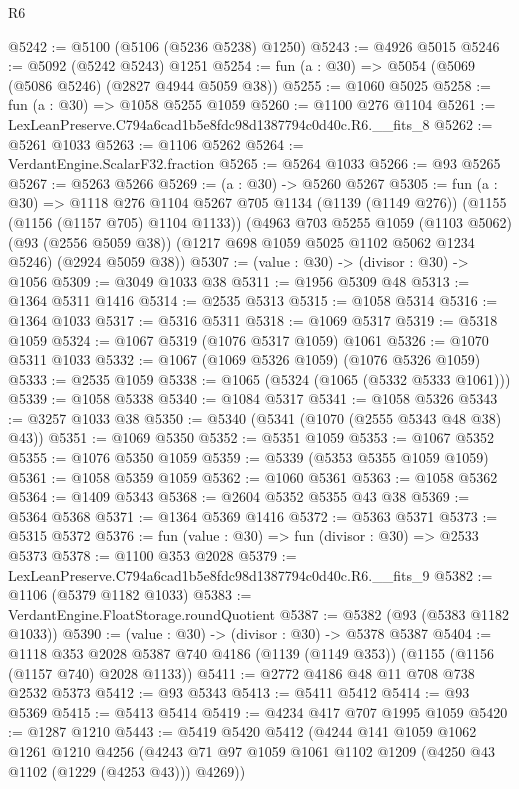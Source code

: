 \begin{lexlean}{R6}
\begin{coremodule}
@5242 := @5100 (@5106 (@5236 @5238) @1250)
@5243 := @4926 @5015
@5246 := @5092 (@5242 @5243) @1251
@5254 := fun (a : @30) => @5054 (@5069 (@5086 @5246) (@2827 @4944 @5059 @38))
@5255 := @1060 @5025
@5258 := fun (a : @30) => @1058 @5255 @1059
@5260 := @1100 @276 @1104
@5261 := LexLeanPreserve.C794a6cad1b5e8fdc98d1387794c0d40c.R6.__fits_8
@5262 := @5261 @1033
@5263 := @1106 @5262
@5264 := VerdantEngine.ScalarF32.fraction
@5265 := @5264 @1033
@5266 := @93 @5265
@5267 := @5263 @5266
@5269 := (a : @30) -> @5260 @5267
@5305 := fun (a : @30) =>
  @1118
    @276
    @1104
    @5267
    @705
    @1134
    (@1139 (@1149 @276))
    (@1155 (@1156 (@1157 @705) @1104 @1133))
    (@4963
      @703
      @5255
      @1059
      (@1103 @5062)
      (@93 (@2556 @5059 @38))
      (@1217 @698 @1059 @5025 @1102 @5062 @1234 @5246)
      (@2924 @5059 @38))
@5307 := (value : @30) -> (divisor : @30) -> @1056
@5309 := @3049 @1033 @38
@5311 := @1956 @5309 @48
@5313 := @1364 @5311 @1416
@5314 := @2535 @5313
@5315 := @1058 @5314
@5316 := @1364 @1033
@5317 := @5316 @5311
@5318 := @1069 @5317
@5319 := @5318 @1059
@5324 := @1067 @5319 (@1076 @5317 @1059) @1061
@5326 := @1070 @5311 @1033
@5332 := @1067 (@1069 @5326 @1059) (@1076 @5326 @1059)
@5333 := @2535 @1059
@5338 := @1065 (@5324 (@1065 (@5332 @5333 @1061)))
@5339 := @1058 @5338
@5340 := @1084 @5317
@5341 := @1058 @5326
@5343 := @3257 @1033 @38
@5350 := @5340 (@5341 (@1070 (@2555 @5343 @48 @38) @43))
@5351 := @1069 @5350
@5352 := @5351 @1059
@5353 := @1067 @5352
@5355 := @1076 @5350 @1059
@5359 := @5339 (@5353 @5355 @1059 @1059)
@5361 := @1058 @5359 @1059
@5362 := @1060 @5361
@5363 := @1058 @5362
@5364 := @1409 @5343
@5368 := @2604 @5352 @5355 @43 @38
@5369 := @5364 @5368
@5371 := @1364 @5369 @1416
@5372 := @5363 @5371
@5373 := @5315 @5372
@5376 := fun (value : @30) => fun (divisor : @30) => @2533 @5373
@5378 := @1100 @353 @2028
@5379 := LexLeanPreserve.C794a6cad1b5e8fdc98d1387794c0d40c.R6.__fits_9
@5382 := @1106 (@5379 @1182 @1033)
@5383 := VerdantEngine.FloatStorage.roundQuotient
@5387 := @5382 (@93 (@5383 @1182 @1033))
@5390 := (value : @30) -> (divisor : @30) -> @5378 @5387
@5404 := @1118
    @353
    @2028
    @5387
    @740
    @4186
    (@1139 (@1149 @353))
    (@1155 (@1156 (@1157 @740) @2028 @1133))
@5411 := @2772 @4186 @48 @11 @708 @738 @2532 @5373
@5412 := @93 @5343
@5413 := @5411 @5412
@5414 := @93 @5369
@5415 := @5413 @5414
@5419 := @4234 @417 @707 @1995 @1059
@5420 := @1287 @1210
@5443 := @5419
    @5420
    @5412
    (@4244
      @141
      @1059
      @1062
      @1261
      @1210
      @4256
      (@4243 @71 @97 @1059 @1061 @1102 @1209 (@4250 @43 @1102 (@1229 (@4253 @43))) @4269))

\end{coremodule}
\end{lexlean}
